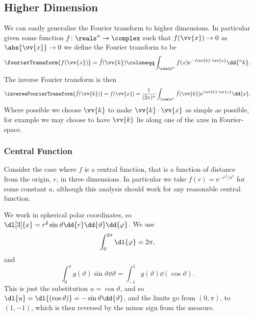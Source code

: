 \documentclass[fleqn]{NotesClass}
\newcommand*{\e}{\mathrm{e}}
\begin{document}
    \subsection{Higher Dimension}
    We can easily generalise the Fourier transform to higher dimensions.
    In particular given some function \(f \colon \reals^n \to \complex\) such that \(f(\vv{x}) \to 0\) as \(\abs{\vv{x}} \to 0\) we define the Fourier transform to be
    \begin{equation}
        \fourierTransform\{f(\vv{x})\} = \tilde{f}(\vv{k}) \coloneqq \int_{\reals^n} f(x) \e^{-i\vv{k} \cdot \vv{x}} \dd{^nk}.
    \end{equation}
    The inverse Fourier transform is then
    \begin{equation}
        \inverseFourierTransform\{\tilde{f}(\vv{k})\} = f(\vv{x}) = \frac{1}{(2\pi)^n} \int_{\reals^n} \tilde{f}(\vv{k}) \e^{i\vv{k} \cdot \vv{x}} \dd{x}.
    \end{equation}
    Where possible we choose \(\vv{k}\) to make \(\vv{k} \cdot \vv{x}\) as simple as possible, for example we may choose to have \(\vv{k}\) lie along one of the axes in Fourier-space.
    
    \subsubsection{Central Function}
    Consider the case where \(f\) is a central function, that is a function of distance from the origin, \(r\), in three dimensions.
    In particular we take \(f(r) = \e^{-r^2/a^2}\) for some constant \(a\), although this analysis should work for any reasonable central function.
    
    We work in spherical polar coordinates, so \(\dl[3]{x} = r^2\sin\vartheta\dd{r}\dd{\vartheta}\dd{\varphi}\).
    We use
    \begin{equation}
        \int_{0}^{2\pi} \dl{\varphi} = 2\pi,
    \end{equation}
    and
    \begin{equation}
        \int_{0}^{\pi} g(\vartheta)\sin\vartheta \dd{\vartheta} = \int_{-1}^{1} g(\vartheta) \dd{(\cos\vartheta)}.
    \end{equation}
    This is just the substitution \(u = \cos\vartheta\), and so \(\dl{u} = \dl{(\cos\vartheta)} = -\sin\vartheta\dd{\vartheta}\), and the limits go from \((0, \pi)\), to \((1, -1)\), which is then reversed by the minus sign from the measure.
    
\end{document}
